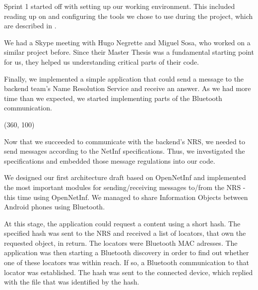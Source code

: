 Sprint 1 started off with setting up our working environment.
This included reading up on and configuring the tools we chose to use during the project,
which are described in .

We had a Skype meeting with Hugo Negrette and Miguel Sosa, who worked on a
similar project before. Since their Master Thesis was a fundamental starting point
for us, they helped us understanding critical parts of their code.

Finally, we implemented a simple application that could send a message to
the backend team's Name Resolution Service and receive an answer. As
we had more time than we expected, we started implementing parts of
the Bluetooth communication.

\framebox(360, 100){
}

Now that we succeeded to communicate with the backend's NRS,
we needed to send messages according to the NetInf specifications.
Thus, we investigated the specifications and embedded those message regulations
into our code. 

We designed our first architecture draft based on OpenNetInf and implemented
the most important modules for sending/receiving messages to/from the NRS -
this time using OpenNetInf. We managed to share Information Objects between
Android phones using Bluetooth. 

At this stage, the application could request a content using a short hash.
The specified hash was sent to the NRS and received a list of locators, that own
the requested object, in return. The locators were Bluetooth MAC adresses.
The application was then starting a Bluetooth discovery in order to find out
whether one of these locators was within reach. If so, a Bluetooth communication
to that locator was established. The hash was sent to the connected device, which
replied with the file that was identified by the hash.


